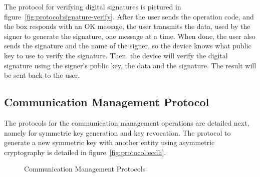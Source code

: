 The protocol for verifying digital signatures is pictured in figure~\ref{fig:protocol:signature-verify}.
After the user sends the operation code, and the box responds with an OK message, the user transmits the data, used by the signer to generate the signature, one message at a time.
When done, the user also sends the signature and the name of the signer, so the device knows what public key to use to verify the signature.
Then, the device will verify the digital signature using the signer's public key, the data and the signature. The result will be sent back to the user.

\subsection{Communication Management Protocol}\label{chap:implementation:protocol:key}

The protocols for the communication management operations are detailed next, namely for symmetric key generation and key revocation. 
The protocol to generate a new symmetric key with another entity using asymmetric cryptography is detailed in figure~\ref{fig:protocol:ecdh}.

\begin{figure}[h!]
	\centering     %
	\caption{Communication Management Protocols}
\end{figure}

